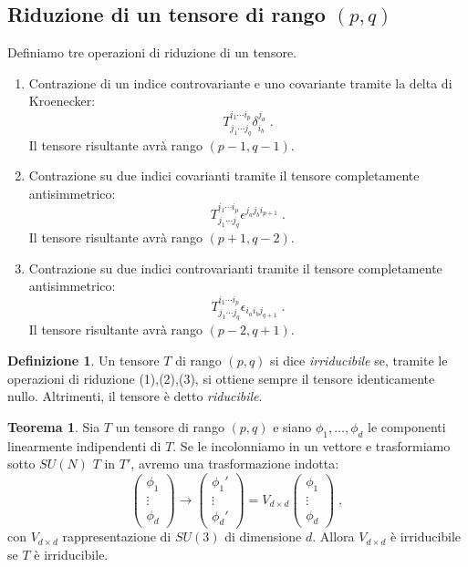 \documentclass[12pt,a4paper]{article}
\theoremstyle{definition}
\newtheorem{thm}{Teorema}
\newtheorem{dfn}{Definizione}[section]
\numberwithin{equation}{section}
\begin{document}
\subsection{Riduzione di un tensore di rango $(p,q)$}
Definiamo tre operazioni di riduzione di un tensore.
\begin{enumerate}
\item Contrazione di un indice controvariante e uno covariante tramite la delta di Kroenecker:
$$
T^{i_1\cdots i_p}_{j_1\cdots j_q}\delta^{j_a}_{i_b}\;.
$$
Il tensore risultante avrà rango $(p-1,q-1)$.
\item Contrazione su due indici covarianti tramite il tensore completamente antisimmetrico:
$$
T^{i_1\cdots i_p}_{j_1\cdots j_q}\epsilon^{j_aj_bi_{p+1}}\;.
$$
Il tensore risultante avrà rango $(p+1,q-2)$.
\item Contrazione su due indici controvarianti tramite il tensore completamente antisimmetrico:
$$
T^{i_1\cdots i_p}_{j_1\cdots j_q}\epsilon_{i_ai_bj_{q+1}}\;.
$$
Il tensore risultante avrà rango $(p-2,q+1)$.
\end{enumerate}
\begin{dfn}
Un tensore $T$ di rango $(p,q)$ si dice \emph{irriducibile} se, tramite le operazioni di riduzione (1),(2),(3), si ottiene sempre il tensore identicamente nullo. Altrimenti, il tensore è detto \emph{riducibile}.
\end{dfn}
\begin{thm}
Sia $T$ un tensore di rango $(p,q)$ e siano $\phi_1,\ldots,\phi_d$ le componenti linearmente indipendenti di $T$. Se le incolonniamo in un vettore e trasformiamo sotto $SU(N)$ $T$ in $T'$, avremo una trasformazione indotta:
\begin{equation}
\left(\begin{matrix}
\phi_1 \\
\vdots \\
\phi_d
\end{matrix}\right)\longrightarrow\left(\begin{matrix}
\phi_1'\\
\vdots \\
\phi_d'
\end{matrix}\right)=V_{d\times d}\left(\begin{matrix}
\phi_1 \\
\vdots \\
\phi_d
\end{matrix}\right)\;,
\end{equation}
con $V_{d\times d}$ rappresentazione di $SU(3)$ di dimensione $d$. Allora $V_{d\times d}$ è irriducibile se $T$ è irriducibile.
\end{thm}
\end{document}
